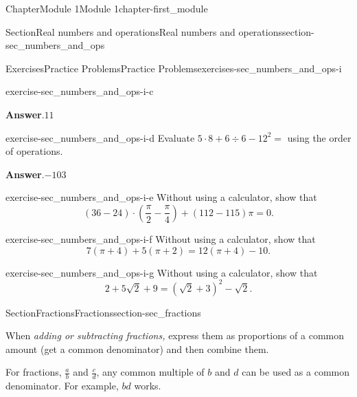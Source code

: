 \documentclass[oneside,10pt,]{book}
\newcommand{\blocktitlefont}{\relax}
\begin{document}
\begin{chapterptx}{Chapter}{Module 1}{}{Module 1}{}{}{chapter-first_module}
\begin{sectionptx}{Section}{Real numbers and operations}{}{Real numbers and operations}{}{}{section-sec_numbers_and_ops}
\begin{exercises-subsection}{Exercises}{Practice Problems}{}{Practice Problems}{}{}{exercises-sec_numbers_and_ops-i}
\begin{divisionexercise}{2}{}{}{exercise-sec_numbers_and_ops-i-c}
\par\smallskip%
\noindent\textbf{\blocktitlefont Answer}.\hypertarget{answer-sec_numbers_and_ops-i-c-b}{}\quad{}\(11\)%
\end{divisionexercise}%
\begin{divisionexercise}{3}{}{}{exercise-sec_numbers_and_ops-i-d}%
Evaluate \(5 \cdot 8 + 6 \div 6 - 12 ^ 2=\) using the order of operations.%
\par\smallskip%
\noindent\textbf{\blocktitlefont Answer}.\hypertarget{answer-sec_numbers_and_ops-i-d-b}{}\quad{}\(-103\)%
\end{divisionexercise}%
\begin{divisionexercise}{4}{}{}{exercise-sec_numbers_and_ops-i-e}%
Without using a calculator, show that%
\begin{equation*}
(36-24)\cdot\left(\frac{\pi}{2} -\frac{\pi}{4}\right) + (112 - 115)\pi = 0\text{.}
\end{equation*}
%
\end{divisionexercise}%
\begin{divisionexercise}{5}{}{}{exercise-sec_numbers_and_ops-i-f}%
Without using a calculator, show that%
\begin{equation*}
7\left(\pi+4\right) + 5\left(\pi+2\right)=12\left(\pi+4\right)-10\text{.}
\end{equation*}
%
\end{divisionexercise}%
\begin{divisionexercise}{6}{}{}{exercise-sec_numbers_and_ops-i-g}%
Without using a calculator, show that%
\begin{equation*}
2+5\sqrt{2}+9=\left(\sqrt{2}+3\right)^2-\sqrt{2}\text{.}
\end{equation*}
%
\end{divisionexercise}%
\end{exercises-subsection}
\end{sectionptx}
%
%
\typeout{************************************************}
\typeout{************************************************}
%
\begin{sectionptx}{Section}{Fractions}{}{Fractions}{}{}{section-sec_fractions}
\begin{introduction}{}%
When \emph{adding or subtracting fractions,} express them as proportions of a common amount (get a common denominator) and then combine them.%
\par
For fractions, \(\frac{a}{b}\) and \(\frac{c}{d}\), any common multiple of \(b\) and \(d\) can be used as a common denominator.  For example, \(bd\) works.%

\end{introduction}
\end{sectionptx}
\end{chapterptx}
\end{document}
